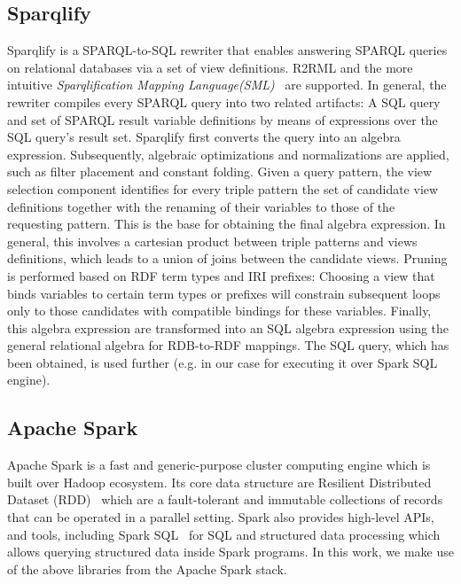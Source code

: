 
\subsection{Sparqlify}
Sparqlify is a SPARQL-to-SQL rewriter that enables answering SPARQL queries on relational databases via a set of view definitions. R2RML and the more intuitive \textit{Sparqlification Mapping Language(SML)}~\cite{sml} are supported. In general, the rewriter compiles every SPARQL query into two related artifacts: A SQL query and set of SPARQL result variable definitions by means of expressions over the SQL query's result set.
Sparqlify first converts the query into an algebra expression. Subsequently, algebraic optimizations and normalizations are applied, such as filter placement and constant folding.
Given a query pattern, the view selection component identifies for every triple pattern the set of candidate view definitions together with the renaming of their variables to those of the requesting pattern. This is the base for obtaining the final algebra expression. In general, this involves a cartesian product between triple patterns and views definitions, which leads to a union of joins between the candidate views. Pruning is performed based on RDF term types and IRI prefixes: Choosing a view that binds variables to certain term types or prefixes will constrain subsequent loops only to those candidates with compatible bindings for these variables.
Finally, this algebra expression are transformed into an SQL algebra expression using the general relational algebra for RDB-to-RDF mappings.
The SQL query, which has been obtained, is used further (e.g. in our case for executing it over Spark SQL engine).

\subsection{Apache Spark}
Apache Spark is a fast and generic-purpose cluster computing engine which is built over Hadoop ecosystem.
Its core data structure are Resilient Distributed Dataset (RDD)~\cite{zaharia2012resilient} which are a fault-tolerant and immutable collections of records that can be operated in a parallel setting.
Spark also provides high-level APIs, and tools, including Spark SQL~\cite{Armbrust2015SSR} for SQL and structured data processing which allows querying structured data inside Spark programs.
In this work, we make use of the above libraries from the Apache Spark stack.


